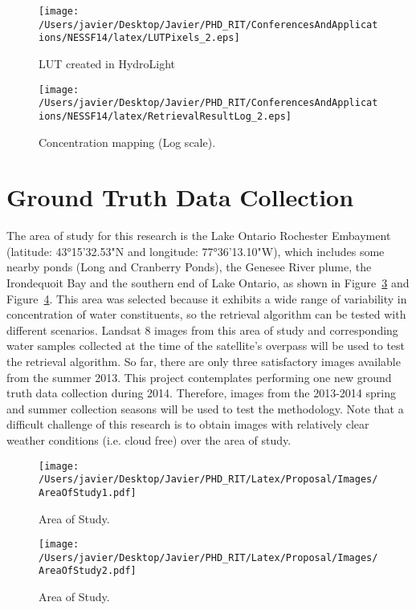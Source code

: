\begin{figure}[htb]
    \centering
      \texttt{[image: /Users/javier/Desktop/Javier/PHD\_RIT/ConferencesAndApplications/NESSF14/latex/LUTPixels\_2.eps]}
      \caption{LUT created in HydroLight\label{fig:results1}}
\end{figure}

\begin{figure}[htb]
    \centering
      \texttt{[image: /Users/javier/Desktop/Javier/PHD\_RIT/ConferencesAndApplications/NESSF14/latex/RetrievalResultLog\_2.eps]}
      \caption{Concentration mapping (Log scale).\label{fig:results2}}
\end{figure}



\section{Ground Truth Data Collection}
The area of study for this research is the Lake Ontario Rochester Embayment (latitude: 43°15'32.53"N and longitude: 77°36'13.10"W), which includes some nearby ponds (Long and Cranberry Ponds), the Genesee River plume, the Irondequoit Bay and the southern end of Lake Ontario, as shown in Figure~\ref{fig:areaofstudy1} and Figure~\ref{fig:areaofstudy2}. This area was selected because it exhibits a wide range of variability in concentration of water constituents, so the retrieval algorithm can be tested with different scenarios. Landsat 8 images from this area of study and corresponding water samples collected at the time of the satellite's overpass will be used to test the retrieval algorithm. So far, there are only three satisfactory images available from the summer 2013. This project contemplates performing one new ground truth data collection during 2014. Therefore, images from the 2013-2014 spring and summer collection seasons will be used to test the methodology. Note that a difficult challenge of this research is to obtain images with relatively clear weather conditions (i.e. cloud free) over the area of study.
\begin{figure}[htb]
  \centering
  \texttt{[image: /Users/javier/Desktop/Javier/PHD\_RIT/Latex/Proposal/Images/AreaOfStudy1.pdf]}
  \caption{Area of Study. \label{fig:areaofstudy1} } 
\end{figure}
\begin{figure}[htb]
  \centering
  \texttt{[image: /Users/javier/Desktop/Javier/PHD\_RIT/Latex/Proposal/Images/AreaOfStudy2.pdf]}
  \caption{Area of Study. \label{fig:areaofstudy2} } 
\end{figure}

